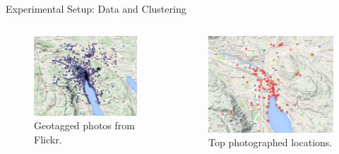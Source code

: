 \documentclass{beamer}
\begin{document}
\begin{frame}{Experimental Setup: Data and Clustering}
  \begin{columns}
    \begin{column}{0.45\textwidth}
      \begin{figure}
        \centering
        \includegraphics[width=\textwidth]{zurich_feature_map_2015}
        \caption{Geotagged photos from Flickr.}
      \end{figure}
    \end{column}
    \begin{column}{0.45\textwidth}
      \begin{figure}
        \centering
        \includegraphics[width=\textwidth]{top_100_zurich}
        \caption{Top photographed locations.}
      \end{figure}
    \end{column}
  \end{columns}
\end{frame}
\end{document}
